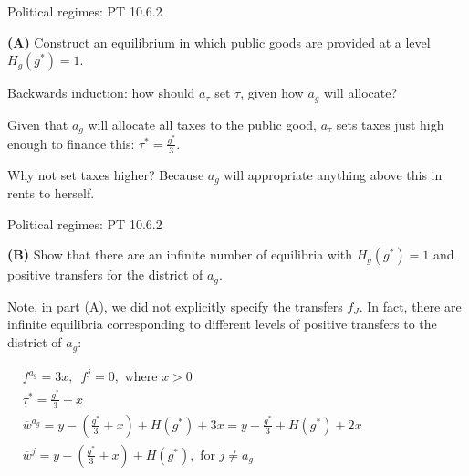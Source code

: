 \documentclass[11pt,aspectratio=169]{beamer}
\begin{document}
\begin{frame}{Political regimes: PT 10.6.2}

\begin{tcolorbox}
\textbf{(A)} Construct an equilibrium in which public goods are provided at a level $H_g(g^*) = 1$.
\end{tcolorbox}

Backwards induction: how should $a_\tau$ set $\tau$, given how $a_g$ will allocate? 

\pause 

Given that $a_g$ will allocate all taxes to the public good, $a_\tau$ sets taxes just high enough to finance this: $\tau^* = \frac{g^*}{3}$. 

\pause

\alert{Why not set taxes higher?} \pause Because $a_g$ will appropriate anything above this in rents to herself.


\end{frame}

\begin{frame}{Political regimes: PT 10.6.2}

\begin{tcolorbox}
\textbf{(B)} Show that there are an infinite number of equilibria with $H_g(g^*) = 1$ and positive transfers for the district of $a_g$.
\end{tcolorbox}

Note, in part (A), we did not explicitly specify the transfers $f_J$. In fact, there are infinite equilibria corresponding to different levels of positive transfers to the district of $a_g$:

\pause

$ \begin{aligned} 
&f^{a_{g}} =3 x, \, \, \, f^{j}=0, \text { where } x>0 \\
&\tau^{*} =\frac{g^{*}}{3}+x \\ 
&\overline{w}^{a_{g}} =y-\left(\frac{g^{*}}{3}+x\right)+H\left(g^{*}\right)+3 x=y-\frac{g^{*}}{3}+H\left(g^{*}\right)+2 x \\ 
&\overline{w}^{j} =y-\left(\frac{g^{*}}{3}+x\right)+H\left(g^{*}\right),\text{  for } j \neq a_{g}  
 \end{aligned}$

\end{frame}
\end{document}
